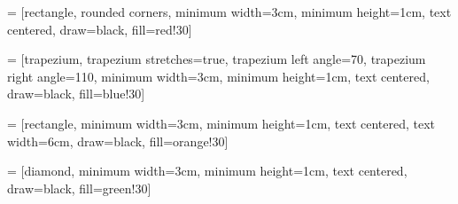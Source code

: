 
\usepackage{tikz}
\usetikzlibrary{positioning, tikzmark, calc, shapes.geometric, arrows}

\newenvironment{myTree}
{
    \begingroup
    \begin{center}
    \begin{tikzpicture}[level distance=1.5cm, level 1/.style={sibling distance=3cm}, level 2/.style={sibling distance=1.5cm}]
}
{
    \end{tikzpicture}
    \end{center}
    \endgroup
}


\newenvironment{myTreeLThree}
{
    \begingroup
    \begin{center}
    \begin{tikzpicture}[level distance=1.5cm, level 1/.style={sibling distance=6cm}, level 2/.style={sibling distance=3cm}, level 3/.style={sibling distance=1.5cm}]
}
{
    \end{tikzpicture}
    \end{center}
    \endgroup
}

\newenvironment{vArrow}[3][black]
{
    \draw[->, #1] (#2) -- (#3);
}
{

}

\newenvironment{tArcDown}[2][black]
{
    \draw[-latex,#1] ($#2$) arc [ start angle=-160, end angle=-20, x radius=0.9cm, y radius =0.7cm ] ;
}
{

}


\newenvironment{tArcUp}[2][red]
{
    \draw[-latex,#1] ($#2$) arc [ start angle=160, end angle=20, x radius=0.9cm, y radius =0.7cm ] ;
}
{

}

 = [rectangle, rounded corners,
minimum width=3cm,
minimum height=1cm,
text centered,
draw=black,
fill=red!30]

 = [trapezium,
trapezium stretches=true, %
trapezium left angle=70,
trapezium right angle=110,
minimum width=3cm,
minimum height=1cm, text centered,
draw=black, fill=blue!30]

 = [rectangle,
minimum width=3cm,
minimum height=1cm,
text centered,
text width=6cm,
draw=black,
fill=orange!30]

 = [diamond,
minimum width=3cm,
minimum height=1cm,
text centered,
draw=black,
fill=green!30]

